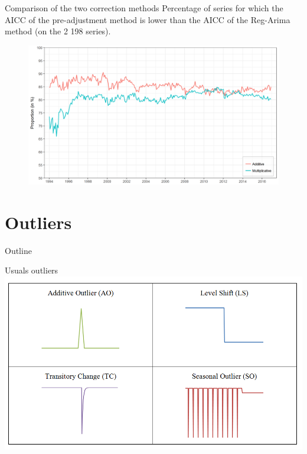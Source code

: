 \documentclass[10pt]{beamer}
\begin{document}
\begin{frame}{Comparison of the two correction methods}
\footnotesize
Percentage of series for which the AICC of the pre-adjustment method is lower than the AICC of the Reg-Arima method (on the 2 198 series).
\normalsize
\begin{figure}
\centering
\includegraphics[width = \textwidth]{img/LYaicc.png}
\end{figure}
\end{frame}

\section{Outliers}
\begin{frame}{Outline}
\end{frame}

\begin{frame}{Usuals outliers}
\centering
\includegraphics[width = \textwidth]{img/Outliers.png}
\end{frame}
\end{document}
